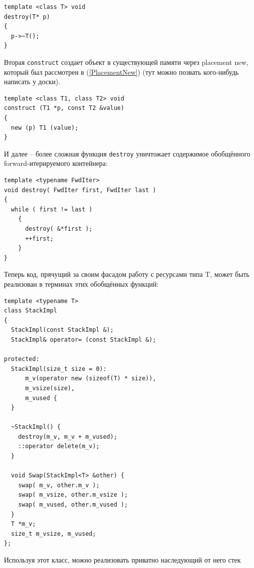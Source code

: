 \documentclass[a4paper,12pt,oneside]{article}
\begin{document}
\begin{lstlisting}
template <class T> void
destroy(T* p)
{
  p->~T();
}
\end{lstlisting}

Вторая \lstinline!construct! создает объект в существующей памяти через placement new, который был рассмотрен в (\ref{PlacementNew}) (тут можно позвать кого-нибудь написать у доски).

\begin{lstlisting}
template <class T1, class T2> void
construct (T1 *p, const T2 &value)
{
  new (p) T1 (value);
}
\end{lstlisting}

И далее -- более сложная функция \lstinline!destroy! уничтожает содержимое обобщённого forward-итерируемого контейнера:

\begin{lstlisting}
template <typename FwdIter>
void destroy( FwdIter first, FwdIter last )
{
  while ( first != last )
    {
      destroy( &*first ); 
      ++first;
    }
}
\end{lstlisting}

Теперь код, прячущий за своим фасадом работу с ресурсами типа T, может быть реализован в терминах этих обобщённых функций:

\begin{lstlisting}
template <typename T>
class StackImpl
{
  StackImpl(const StackImpl &);
  StackImpl& operator= (const StackImpl &);

protected:
  StackImpl(size_t size = 0): 
      m_v(operator new (sizeof(T) * size)), 
      m_vsize(size), 
      m_vused {
  }

  ~StackImpl() { 
    destroy(m_v, m_v + m_vused); 
    ::operator delete(m_v); 
  }

  void Swap(StackImpl<T> &other) {
    swap( m_v, other.m_v );
    swap( m_vsize, other.m_vsize );
    swap( m_vused, other.m_vused );
  }
  T *m_v;
  size_t m_vsize, m_vused;
};
\end{lstlisting}

Используя этот класс, можно реализовать приватно наследующий от него стек
\end{document}

